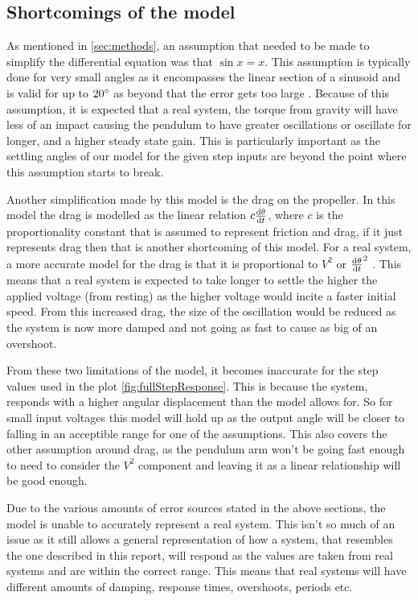 \documentclass[a4paper, 11pt, compsoc]{IEEEtran}
\begin{document}
        \subsection{Shortcomings of the model}
            As mentioned in \cref{sec:methods}, an assumption that needed to be made to simplify the differential equation was that $\sin{x} = x$. This assumption is typically done for very small angles as it encompasses the linear section of a sinusoid and is valid for up to $20\degree$ as beyond that the error gets too large \cite{russel_2020}. Because of this assumption, it is expected that a real system, the torque from gravity will have less of an impact causing the pendulum to have greater oscillations or oscillate for longer, and a higher steady state gain. This is particularly important as the settling angles of our model for the given step inputs are beyond the point where this assumption starts to break.
            \par 
            Another simplification made by this model is the drag on the propeller. In this model the drag is modelled as the linear relation $c\dv{\theta}{t}$, where $c$ is the proportionality constant that is assumed to represent friction and drag, if it just represents drag then that is another shortcoming of this model. For a real system, a more accurate model for the drag is that it is proportional to $V^2$ or $\dv{\theta}{t}^2$ \cite{Gupta2018}. This means that a real system is expected to take longer to settle the higher the applied voltage (from resting) as the higher voltage would incite a faster initial speed. From this increased drag, the size of the oscillation would be reduced as the system is now more damped and not going as fast to cause as big of an overshoot.
            \par
            From these two limitations of the model, it becomes inaccurate for the step values used in the plot \cref{fig:fullStepResponse}. This is because the system, responds with a higher angular displacement than the model allows for. So for small input voltages this model will hold up as the output angle will be closer to falling in an acceptible range for one of the assumptions. This also covers the other assumption around drag, as the pendulum arm won't be going fast enough to need to consider the $V^2$ component and leaving it as a linear relationship will be good enough.
            \par
            Due to the various amounts of error sources stated in the above sections, the model is unable to accurately represent a real system. This isn't so much of an issue as it still allows a general representation of how a system, that resembles the one described in this report, will respond as the values are taken from real systems and are within the correct range. This means that real systems will have different amounts of damping, response times, overshoots, periods etc.
        
\end{document}
